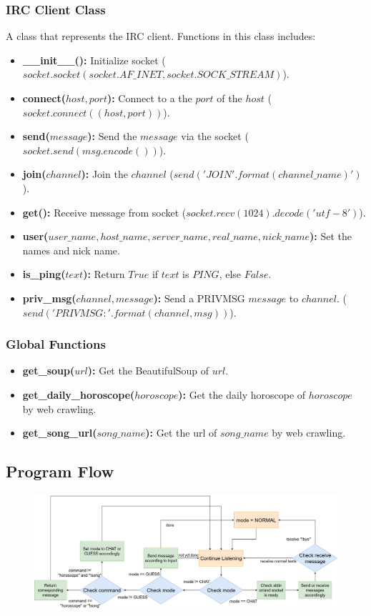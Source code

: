 \documentclass{article}
\begin{document}
\subsubsection{IRC Client Class}
A class that represents the IRC client.
Functions in this class includes:
\begin{itemize}
  \small
  \item \textbf{\_\_init\_\_():} Initialize socket ($socket.socket(socket.AF\_INET, socket.SOCK\_STREAM)$).
  \item \textbf{connect($host, port$):} Connect to a the $port$ of the $host$ ($socket.connect((host, port))$).
  \item \textbf{send($message$):} Send the $message$ via the socket ($socket.send(msg.encode())$).
  \item \textbf{join($channel$):} Join the $channel$ ($send('JOIN {}'.format(channel\_name)')$).
  \item \textbf{get():} Receive message from socket ($socket.recv(1024).decode('utf-8')$).
  \item \textbf{user($user\_name, host\_name, server\_name, real\_name, nick\_name$):} Set the names and nick name.
  \item \textbf{is\_ping($text$):} Return $True$ if $text$ is $PING$, else $False$.
  \item \textbf{priv\_msg($channel, message$):} Send a PRIVMSG $message$ to $channel$. ($send('PRIVMSG {} :{}'.format(channel, msg))$).
\end{itemize}

\subsubsection{Global Functions}
\begin{itemize}
  \item \textbf{get\_soup($url$):} Get the BeautifulSoup of $url$.
  \item \textbf{get\_daily\_horoscope($horoscope$):} Get the daily horoscope of $horoscope$ by web crawling.
  \item \textbf{get\_song\_url($song\_name$):} Get the url of $song\_name$ by web crawling.
\end{itemize}

\subsection{Program Flow}
\begin{figure}[h]
 \centering
 \includegraphics[width=\textwidth]{flow.png}
\end{figure}
\end{document}
